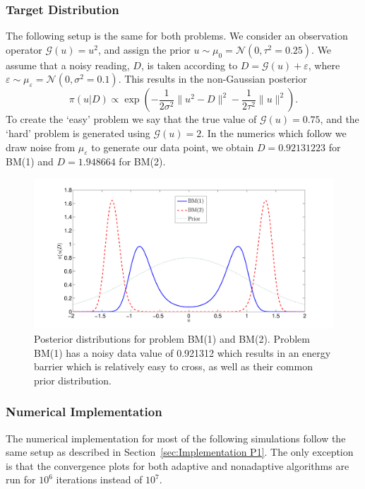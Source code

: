\documentclass[final]{siamltex}
\newcommand{\G}{\mathcal{G}}
\newcommand{\N}{\mathcal{N}}
\begin{document}
\subsubsection{Target Distribution}

The following setup is the same for both problems. We consider an observation operator $\G(u) = u^2$, and assign the prior $u \sim \mu_0 = \N(0, \tau^2=0.25)$. We assume that a noisy reading, $D$, is taken according to $D = \G(u) + \varepsilon$, where $\varepsilon \sim \mu_\varepsilon = \N(0, \sigma^2 = 0.1)$. This results in the non-Gaussian posterior
\[
	\pi(u|D) \propto \exp\left(-\frac{1}{2\sigma^2}\|u^2 - D\|^2 - \frac{1}{2\tau^2}\|u\|^2\right).
\]
To create the `easy' problem we say that the true value of $\G(u) = 0.75$, and the `hard' problem is generated using $\G(u) = 2$. In the numerics which follow we draw noise from $\mu_\varepsilon$ to generate our data point, we obtain $D = 0.92131223$ for BM(1) and $D = 1.948664$ for BM(2).

\begin{figure}[htpb]
\begin{center}
\includegraphics[width=\textwidth]{"figures/posteriors3"}
\caption{Posterior distributions for problem BM(1) and BM(2). Problem BM(1) has a noisy data value of  0.921312 which results in an energy barrier which is relatively easy to cross, as well as their common prior distribution.}
\label{fig:problem 3 posteriors}
\end{center}
\end{figure}

\subsubsection{Numerical Implementation}\label{sec:Implementation P2}

The numerical implementation for most of the following simulations follow the same setup as described in Section~\ref{sec:Implementation P1}. The only exception is that the convergence plots for both adaptive and nonadaptive algorithms are run for $10^6$ iterations instead of $10^7$.
\end{document}

